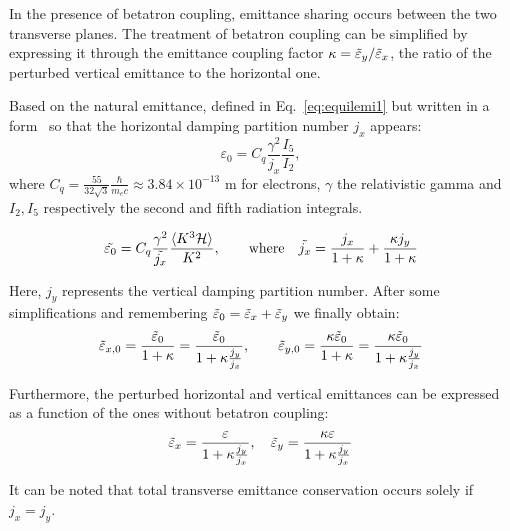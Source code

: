 In the presence of betatron coupling, emittance sharing occurs between the two transverse planes. The treatment of betatron coupling can be simplified by expressing it through the emittance coupling factor $\kappa = \Tilde{\varepsilon}_y/\Tilde{\varepsilon}_x$, the ratio of the perturbed vertical emittance to the horizontal one.

Based on the natural emittance, defined in Eq.~\eqref{eq:equilemi1} but written in a form~\cite{Lee:2018fhc} so that the horizontal damping partition number $j_x$ appears:
\begin{equation*}
    \varepsilon_0 = C_q \frac{\gamma^2}{j_x} \frac{I_5}{I_2},
\end{equation*}
where $C_q = \frac{55}{32 \sqrt{3}} \frac{\hbar}{m_e c} \approx 3.84 \times 10^{-13}$ m for electrons, $\gamma$ the relativistic gamma and $I_2,I_5$ respectively the second and fifth radiation integrals.

\begin{equation}
    \Tilde{\varepsilon_0} = C_q \frac{\gamma^2}{\Tilde{j_x}} \frac{\langle K^3 \mathcal{H} \rangle}{K^2}, \qquad \mathrm{where} \quad \Tilde{j_x} = \frac{j_x}{1 + \kappa} + \frac{\kappa j_y}{1 + \kappa}
\label{eq:j_kappa}
\end{equation}

Here, $j_y$ represents the vertical damping partition number.
After some simplifications and remembering $\Tilde{\varepsilon}_0 = \Tilde{\varepsilon}_x + \Tilde{\varepsilon}_y$ we finally obtain:
\begin{equation}
    \Tilde{\varepsilon}_{x,0} = \frac{\Tilde{\varepsilon}_0}{1 + \kappa} = \frac{\Tilde{\varepsilon}_0}{1 + \kappa \frac{j_y}{j_x}}, \qquad \Tilde{\varepsilon}_{y,0} = \frac{\kappa \Tilde{\varepsilon}_0}{1 + \kappa} = \frac{\kappa \Tilde{\varepsilon}_0}{1 + \kappa \frac{j_y}{j_x}}
\label{eq:eps_kappa}
\end{equation}

Furthermore, the perturbed horizontal and vertical emittances can be expressed as a function of the ones without betatron coupling:
\begin{equation*}
    \Tilde{\varepsilon}_x = \frac{\varepsilon}{1 + \kappa \frac{j_y}{j_x}}, \quad \Tilde{\varepsilon}_y = \frac{\kappa \varepsilon}{1 + \kappa \frac{j_y}{j_x}}
\end{equation*}

It can be noted that total transverse emittance conservation occurs solely if $j_x = j_y$.

